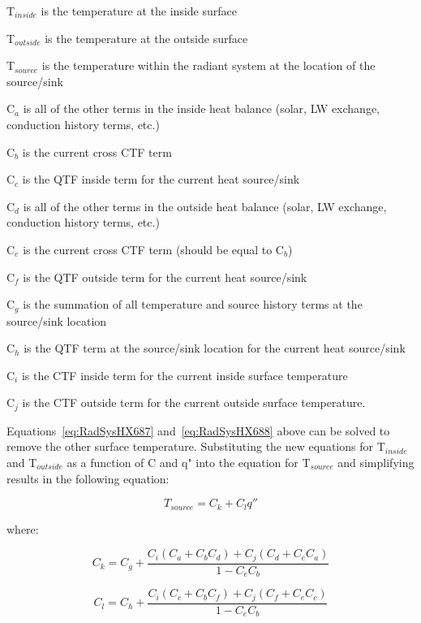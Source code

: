 T\(_{inside}\) is the temperature at the inside surface

T\(_{outside}\) is the temperature at the outside surface

T\(_{source}\) is the temperature within the radiant system at the location of the source/sink

C\(_{a}\) is all of the other terms in the inside heat balance (solar, LW exchange, conduction history terms, etc.)

C\(_{b}\) is the current cross CTF term

C\(_{c}\) is the QTF inside term for the current heat source/sink

C\(_{d}\) is all of the other terms in the outside heat balance (solar, LW exchange, conduction history terms, etc.)

C\(_{e}\) is the current cross CTF term (should be equal to C\(_b\))

C\(_{f}\) is the QTF outside term for the current heat source/sink

C\(_{g}\) is the summation of all temperature and source history terms at the source/sink location

C\(_{h}\) is the QTF term at the source/sink location for the current heat source/sink

C\(_{i}\) is the CTF inside term for the current inside surface temperature

C\(_{j}\) is the CTF outside term for the current outside surface temperature.

Equations~\ref{eq:RadSysHX687} and~\ref{eq:RadSysHX688} above can be solved to remove the other surface temperature. Substituting the new equations for T\(_{inside}\) and T\(_{outside}\) as a function of C and q" into the equation for T\(_{source}\) and simplifying results in the following equation:

\begin{equation}
{T_{source}} = {C_k} + {C_l}q''
\end{equation}

where:

\begin{equation}
{C_k} = {C_g} + \frac{{{C_i}\left( {{C_a} + {C_b}{C_d}} \right) + {C_j}\left( {{C_d} + {C_e}{C_a}} \right)}}{{1 - {C_e}{C_b}}}
\end{equation}

\begin{equation}
{C_l} = {C_h} + \frac{{{C_i}\left( {{C_c} + {C_b}{C_f}} \right) + {C_j}\left( {{C_f} + {C_e}{C_c}} \right)}}{{1 - {C_e}{C_b}}}
\end{equation}


